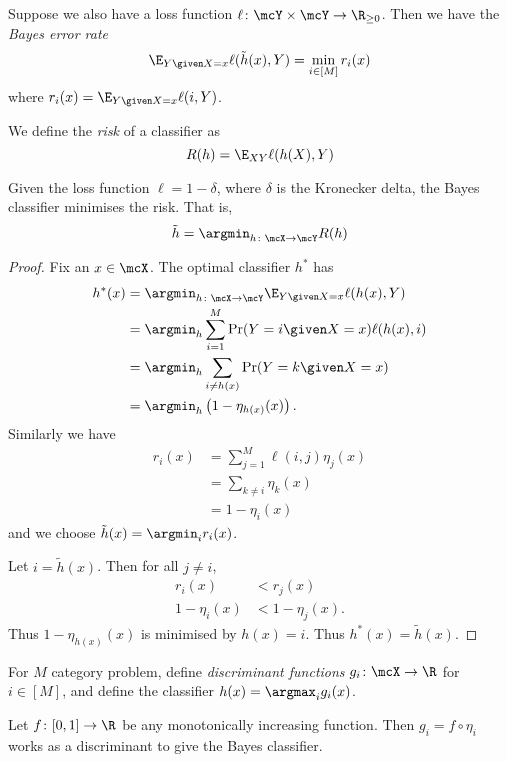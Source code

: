 Suppose we also have a loss function
$\ell\colon \mcY \times \mcY \to \R_{\ge 0}$.
Then we have the \emph{Bayes error rate} \[
    \E_{Y \given X = x} \ell(\tilde{h}(x), Y)
        = \min_{i \in [M]} r_i(x)
\] where $r_i(x) = \E_{Y \given X = x} \ell(i, Y)$.

We define the \emph{risk} of a classifier as \[
    R(h) = \E_{XY} \ell(h(X), Y)
\]
\begin{theorem}
    Given the loss function $\ell = 1 - \delta$, where $\delta$ is the
    Kronecker delta, the Bayes classifier minimises the risk.
    That is, \[
        \tilde{h} = \argmin_{h\colon \mcX \to \mcY} R(h)
    \]
\end{theorem}
\begin{proof}
    Fix an $x \in \mcX$.
    The optimal classifier $h^*$ has \begin{align*}
        h^*(x) &= \argmin_{h\colon \mcX \to \mcY} \E_{Y \given X = x} \ell(h(x), Y) \\
            &= \argmin_{h} \sum_{i = 1}^{M} \Pr(Y = i \given X = x) \ell(h(x), i) \\
            &= \argmin_{h} \sum_{i \ne h(x)} \Pr(Y = k \given X = x) \\
            &= \argmin_{h} \left(1 - \eta_{h(x)}(x)\right).
    \end{align*} Similarly we have \begin{align*}
        r_i(x) &= \sum_{j = 1}^{M} \ell(i, j) \eta_j(x) \\
              &= \sum_{k \ne i} \eta_k(x) \\
              &= 1 - \eta_i(x)
    \end{align*} and we choose $\tilde{h}(x) = \argmin_i r_i(x)$.

    Let $i = \tilde{h}(x)$.
    Then for all $j \ne i$, \begin{align*}
        r_i(x)     &< r_j(x) \\
        1 - \eta_i(x) &< 1 - \eta_j(x).
    \end{align*}
    Thus $1 - \eta_{h(x)}(x)$ is minimised by $h(x) = i$.
    Thus $h^*(x) = \tilde{h}(x)$.
\end{proof}

For $M$ category problem, define \emph{discriminant functions}
$g_i\colon \mcX \to \R$ for $i \in [M]$, and define the classifier
$h(x) = \argmax_i g_i(x)$.

Let $f\colon [0, 1] \to \R$ be any monotonically increasing function.
Then $g_i = f \circ \eta_i$ works as a discriminant to give the Bayes
classifier.

